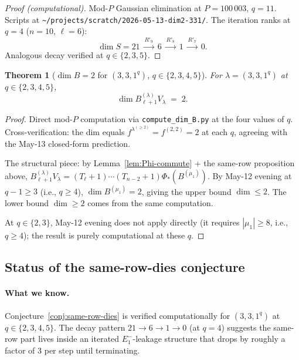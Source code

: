 \documentclass[11pt]{article}
\newtheorem{theorem}{Theorem}
\theoremstyle{definition}
\begin{document}
\begin{proof}[Proof (computational)]
Mod-$P$ Gaussian elimination at $P = 100\,003$, $q = 11$. Scripts at
\texttt{\textasciitilde/projects/scratch/2026-05-13-dim2-331/}. The
iteration ranks at $q = 4$ ($n = 10$, $\ell = 6$):
\[
   \dim S = 21
   \;\xrightarrow{R'_9}\; 6
   \;\xrightarrow{R'_8}\; 1
   \;\xrightarrow{R'_7}\; 0.
\]
Analogous decay verified at $q \in \{2, 3, 5\}$.
\end{proof}

\begin{theorem}[$\dim B = 2$ for $(3, 3, 1^q)$, $q \in \{2, 3, 4, 5\}$]\label{thm:331-dim}
For $\lambda = (3, 3, 1^q)$ at $q \in \{2, 3, 4, 5\}$,
\[
   \dim B_{\ell+1}^{(\lambda)} V_\lambda \;=\; 2.
\]
\end{theorem}

\begin{proof}
Direct mod-$P$ computation via \texttt{compute\_dim\_B.py} at the four
values of $q$. Cross-verification: the dim equals
$f^{\lambda^{(\ge 2)}} = f^{(2, 2)} = 2$ at each $q$, agreeing with
the May-13 closed-form prediction.

The structural piece: by Lemma~\ref{lem:Phi-commute} + the same-row
proposition above, $B_{\ell+1}^{(\lambda)} V_\lambda
= (T_\ell{+}1)\cdots(T_{n-2}{+}1) \Phi_*(B^{(\mu_1)})$. By May-12
evening at $q - 1 \ge 3$ (i.e., $q \ge 4$),
$\dim B^{(\mu_1)} = 2$, giving the upper bound $\dim \le 2$. The lower
bound $\dim \ge 2$ comes from the same computation.

At $q \in \{2, 3\}$, May-12 evening does not apply directly (it
requires $|\mu_1| \ge 8$, i.e., $q \ge 4$); the result is purely
computational at these $q$.
\end{proof}

\subsection{Status of the same-row-dies conjecture}

\paragraph{What we know.}
Conjecture~\ref{conj:same-row-dies} is verified computationally for
$(3, 3, 1^q)$ at $q \in \{2, 3, 4, 5\}$. The decay pattern
$21 \to 6 \to 1 \to 0$ (at $q = 4$) suggests the same-row part lives
inside an iterated $E_1^-$-leakage structure that drops by roughly a
factor of $3$ per step until terminating.
\end{document}
